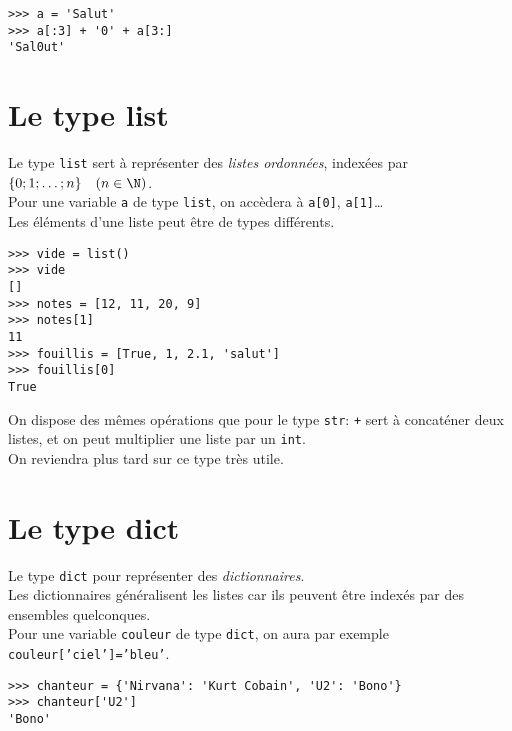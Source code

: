 \begin{pyc}\begin{verbatim}
>>> a = 'Salut'
>>> a[:3] + '0' + a[3:]
'Sal0ut'
\end{verbatim}
\end{pyc}

\section{Le type list}

Le type \texttt{list} sert à représenter des \textit{listes ordonnées}, indexées par $\lbrace 0;1;\ldots ;n\rbrace\quad (n\in\N)$.\\
Pour une variable \texttt{a} de type \texttt{list}, on accèdera à \texttt{a[0]}, \texttt{a[1]}\ldots\\
Les éléments d'une liste peut être de types différents.

\begin{pyc}\begin{verbatim}
>>> vide = list()
>>> vide
[]
>>> notes = [12, 11, 20, 9]
>>> notes[1]
11
>>> fouillis = [True, 1, 2.1, 'salut']
>>> fouillis[0]
True
\end{verbatim}
\end{pyc}

On dispose des mêmes opérations que pour le type \texttt{str}: \texttt{+} sert à concaténer deux listes, et on peut multiplier une liste par un \texttt{int}.\\

On reviendra plus tard sur ce type très utile.

\section{Le type dict}
Le type \texttt{dict} pour représenter des \textit{dictionnaires}.\\
Les dictionnaires généralisent les listes car ils peuvent être indexés par des ensembles quelconques.\\
Pour une variable \texttt{couleur} de type \texttt{dict}, on aura par exemple \texttt{couleur['ciel']='bleu'}.

\begin{pyc}\begin{verbatim}
>>> chanteur = {'Nirvana': 'Kurt Cobain', 'U2': 'Bono'}
>>> chanteur['U2']
'Bono'
\end{verbatim}
\end{pyc}


